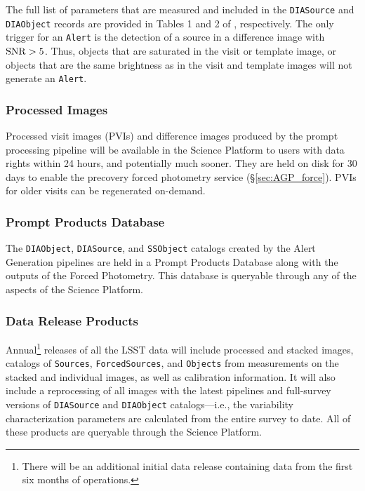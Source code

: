 The full list of parameters that are measured and included in the {\tt DIASource} and {\tt DIAObject} records are provided in Tables 1 and 2 of , respectively.
The only trigger for an {\tt Alert} is the detection of a source in a difference image with ${\rm SNR} > 5$. 
Thus, objects that are saturated in the visit or template image, or objects that are the same brightness as in the visit and template images will not generate an {\tt Alert}.

\subsubsection{Processed Images} \label{sec:products}

Processed visit images (PVIs) and difference images produced by the prompt processing pipeline will be available in the Science Platform to users with data rights within 24 hours, and potentially much sooner.
They are held on disk for 30 days to enable the precovery forced photometry service (\S \ref{sec:AGP_force}).
PVIs for older visits can be regenerated on-demand.

\subsubsection{Prompt Products Database} \label{sec:ppdb}

The \texttt{DIAObject}, \texttt{DIASource}, and \texttt{SSObject} catalogs created by the Alert Generation pipelines are held in a Prompt Products Database along with the outputs of the Forced Photometry.
This database is queryable through any of the aspects of the Science Platform.


\subsubsection{Data Release Products} \label{sec:drp}

Annual\footnote{There will be an additional initial data release containing data from the first six months of operations.}  releases of all the LSST data will include processed and stacked images, catalogs of {\tt Sources}, {\tt ForcedSources}, and {\tt Objects} from measurements on the stacked and individual images, as well as calibration information.
It will also include a  reprocessing of all images with the latest pipelines and full-survey versions of {\tt DIASource} and {\tt DIAObject} catalogs---i.e., the variability characterization parameters are calculated from the entire survey to date.
All of these products are queryable through the Science Platform.

